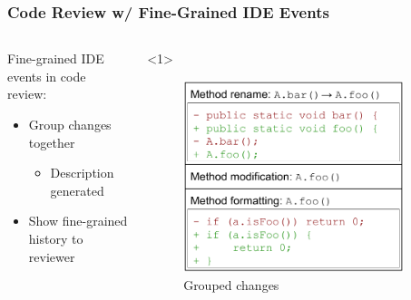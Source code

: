 \documentclass[aspectratio=169]{beamer}
\begin{document}
\begin{frame}[fragile]

\frametitle{Code Review w/ Fine-Grained IDE Events}

\begin{columns}

\begin{column}{0.5\textwidth}

Fine-grained IDE events in code review:

\begin{itemize}
\item<1-> Group changes together
\begin{itemize}
\item<1-> Description generated
\end{itemize}
\item<2-> Show fine-grained history to reviewer

\end{itemize}
\end{column}

\begin{column}{0.5\textwidth}

\begin{onlyenv}<1>
\begin{figure}
\begin{center}
\includegraphics[width=0.9\textwidth]{img/example_groups.pdf}
\end{center}
\caption{Grouped changes}
\end{figure}
\end{onlyenv}


\end{column}
\end{columns}
\end{frame}
\end{document}
